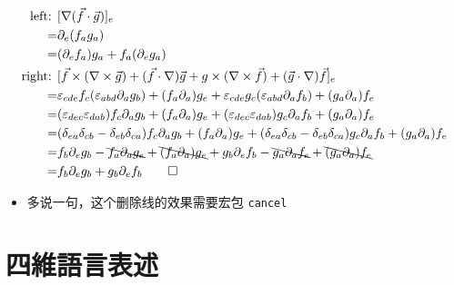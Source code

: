 \documentclass{article}
\begin{document}
$$\begin{aligned}
        \text{left: }  & [\nabla(\vec{f}\cdot\vec{g})]_{e}                                                                                                                                                             \\
        =              & \partial_{e}(f_ag_a)                                                                                                                                                                          \\
        =              & (\partial_{e}f_{a})g_{a}+f_{a}(\partial_{e}g_{a})                                                                                                                                             \\
        \text{right: } & [\vec{f}\times(\nabla\times\vec{g})+(\vec{f}\cdot\nabla)\vec{g}+g\times(\nabla\times\vec{f})+(\vec{g}\cdot\nabla)\vec{f}]_{e}                                                                 \\
        =              & \varepsilon_{cde}f_{c}(\varepsilon_{abd}\partial_{a}g_{b})+(f_{a}\partial_{a})g_{e}+\varepsilon_{cde}g_{c}(\varepsilon_{abd}\partial_{a}f_{b})+(g_{a}\partial_{a})f_{e}                       \\
        =              & (\varepsilon_{dec}\varepsilon_{dab})f_{c}\partial_{a}g_{b}+(f_{a}\partial_{a})g_{e}+(\varepsilon_{dec}\varepsilon_{dab})g_{c}\partial_{a}f_{b}+(g_{a}\partial_{a})f_{e}                       \\
        =              & (\delta_{ea}\delta_{cb}-\delta_{eb}\delta_{ca})f_{c}\partial_{a}g_{b}+(f_{a}\partial_{a})g_{e}+(\delta_{ea}\delta_{cb}-\delta_{eb}\delta_{ca})g_{c}\partial_{a}f_{b}+(g_{a}\partial_{a})f_{e} \\
        =              & f_{b}\partial_{e}g_{b}-\bcancel{f_{a}\partial_{a}g_{e}}+\bcancel{(f_{a}\partial_{a})g_{e}}+g_{b}\partial_{e}f_{b}-\bcancel{g_{a}\partial_{a}f_{e}}+\bcancel{(g_{a}\partial_{a})f_{e}}         \\
        =              & f_{b}\partial_{e}g_{b}+g_{b}\partial_{e}f_{b}\qquad\square
    \end{aligned}$$

\begin{itemize}
    \item 多说一句，这个删除线的效果需要宏包 \texttt{cancel}
\end{itemize}

\section{四維語言表述}
\end{document}
